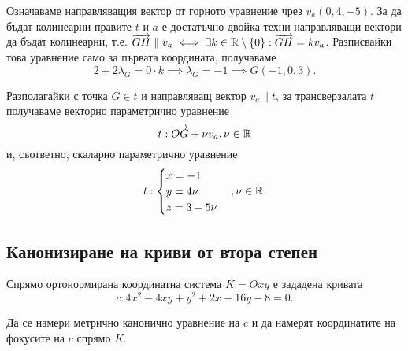 \documentclass[numbers=endperiod, DIV=15, bibliography=totocnumbered]{scrartcl}
\begin{document}
\begin{solution}
\begin{enumerate}[label=\alph*)]
    Означаваме направляващия вектор от горното уравнение чрез $v_a(0, 4, -5)$. За да бъдат колинеарни правите $t$ и $a$ е достатъчно двойка техни направляващи вектори да бъдат колинеарни, т.е. $\overrightarrow{GH} \parallel v_a \iff \exists k \in \mathbb{R} \setminus \{ 0 \} : \overrightarrow{GH} = k v_a$. Разписвайки това уравнение само за първата координата, получаваме
    \begin{displaymath}
      2 + 2\lambda_G = 0 \cdot k \implies \lambda_G = -1 \implies G(-1, 0, 3).
    \end{displaymath}

    Разполагайки с точка $G \in t$ и направляващ вектор $v_a \parallel t$, за трансверзалата $t$ получаваме векторно параметрично уравнение
    \begin{displaymath}
      t: \overrightarrow{OG} + \nu v_a, \nu \in \mathbb{R}
    \end{displaymath}
    и, съответно, скаларно параметрично уравнение
    \begin{displaymath}
      t: \begin{cases}
        x = -1 \\
        y = 4\nu \\
        z = 3 - 5\nu
      \end{cases},
      \nu \in \mathbb{R}.
    \end{displaymath}
  \end{enumerate}
\end{solution}

\subsection{Канонизиране на криви от втора степен}

\begin{exercise}
  Спрямо ортонормирана координатна система $K = Oxy$ е зададена кривата
  \begin{displaymath}
    c: 4x^2 - 4xy + y^2 + 2x - 16y - 8 = 0.
  \end{displaymath}

  Да се намери метрично канонично уравнение на $c$ и да намерят координатите на фокусите на $c$ спрямо $K$.
\end{exercise}
\end{document}
